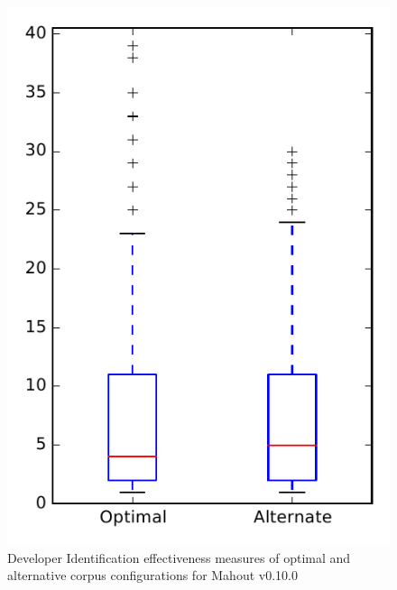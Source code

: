 
\begin{figure}
\centering
\includegraphics[height=0.4\textheight]{figures/combo/dit_rq2_mahout}
\caption{Developer Identification effectiveness measures of optimal and alternative corpus configurations for Mahout v0.10.0}
\label{fig:combo:dit:rq2:mahout}
\end{figure}
